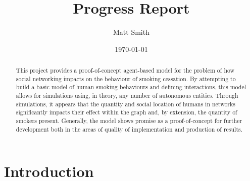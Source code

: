 \documentclass[]{report}
\begin{document}
\title{Progress Report}
\author{Matt Smith}
\date{\today}
\maketitle
\begin{abstract}
This project provides a proof-of-concept agent-based model for the problem of how social networking impacts on the behaviour of smoking cessation. By attempting to build a basic model of human smoking behaviours and defining interactions, this model allows for  simulations using, in theory, any number of autonomous entities. Through simulations, it appears that the quantity and social location of humans in networks significantly impacts their effect within the graph and, by extension, the quantity of smokers present. Generally, the model shows promise as a proof-of-concept for further development both in the areas of quality of implementation and production of results.
\end{abstract}

\tableofcontents

%
%
\chapter{Introduction}
\end{document}
